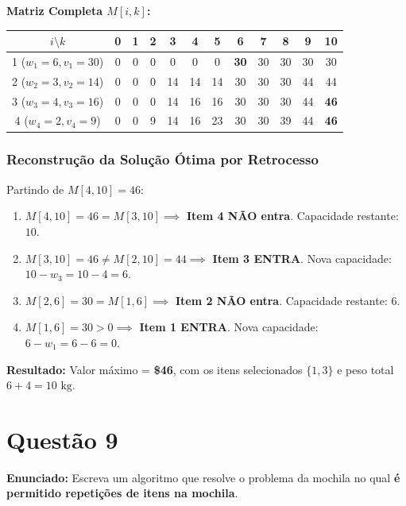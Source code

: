 \documentclass[11pt,a4paper]{article}
\begin{document}
\textbf{Matriz Completa $M[i, k]$:}
\begin{center}
\begin{tabular}{c|ccccccccccc}
\toprule
$i \setminus k$ & 0 & 1 & 2 & 3 & 4 & 5 & 6 & 7 & 8 & 9 & 10 \\
\midrule
1 ($w_1=6, v_1=30$) & 0 & 0 & 0 & 0 & 0 & 0 & \textbf{30} & 30 & 30 & 30 & 30 \\
2 ($w_2=3, v_2=14$) & 0 & 0 & 0 & 14 & 14 & 14 & 30 & 30 & 30 & 44 & 44 \\
3 ($w_3=4, v_3=16$) & 0 & 0 & 0 & 14 & 16 & 16 & 30 & 30 & 30 & 44 & \textbf{46} \\
4 ($w_4=2, v_4=9$)  & 0 & 0 & 9 & 14 & 16 & 23 & 30 & 30 & 39 & 44 & \textbf{46} \\
\bottomrule
\end{tabular}
\end{center}

\subsubsection*{Reconstrução da Solução Ótima por Retrocesso}
Partindo de $M[4, 10] = 46$:
\begin{enumerate}
    \item $M[4, 10] = 46 = M[3, 10] \implies$ \textbf{Item 4 NÃO entra}. Capacidade restante: $10$.
    \item $M[3, 10] = 46 \ne M[2, 10] = 44 \implies$ \textbf{Item 3 ENTRA}. Nova capacidade: $10 - w_3 = 10 - 4 = 6$.
    \item $M[2, 6] = 30 = M[1, 6] \implies$ \textbf{Item 2 NÃO entra}. Capacidade restante: $6$.
    \item $M[1, 6] = 30 > 0 \implies$ \textbf{Item 1 ENTRA}. Nova capacidade: $6 - w_1 = 6 - 6 = 0$.
\end{enumerate}

\textbf{Resultado:} Valor máximo = \textbf{\$46}, com os itens selecionados $\{1, 3\}$ e peso total $6 + 4 = 10\text{ kg}$.

\vspace{0.4cm}

\section*{Questão 9}
\textbf{Enunciado:} Escreva um algoritmo que resolve o problema da mochila no qual \textbf{é permitido repetições de itens na mochila}.
\end{document}

